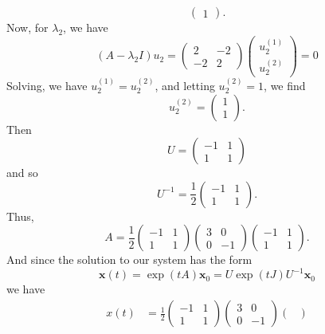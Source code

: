 \documentclass{article}
\begin{document}
\begin{itemize}
\begin{itemize}
\[\begin{pmatrix}
            1
        \end{pmatrix}.\]
        Now, for $\lambda_2$, we have
        \[(A - \lambda_2I)u_2 = \begin{pmatrix}
            2 & -2\\
            -2 & 2
        \end{pmatrix}\begin{pmatrix}
            u_2^{(1)}\\
            u_2^{(2)}
        \end{pmatrix} = 0\]
        Solving, we have $u_2^{(1)} = u_2^{(2)}$, and letting $u_2^{(2)} = 1$, we find
        \[u_2^{(2)} = \begin{pmatrix}
            1\\
            1
        \end{pmatrix}.\]
        Then
        \[U = \begin{pmatrix}
            -1 & 1\\
            1 & 1
        \end{pmatrix}\]
        and so
        \[U^{-1} = \frac{1}{2}\begin{pmatrix}
            -1 & 1\\
            1 & 1
        \end{pmatrix}.\]
        Thus,
        \[A = \frac{1}{2}\begin{pmatrix}
            -1 & 1\\
            1 & 1
        \end{pmatrix}\begin{pmatrix}
            3 & 0\\
            0 & -1
        \end{pmatrix}\begin{pmatrix}
            -1 & 1\\
            1 & 1
        \end{pmatrix}.\]
        And since the solution to our system has the form
        \[\mathbf{x}(t) = \exp(tA)\mathbf{x}_0 = U\exp(tJ)U^{-1}\mathbf{x}_0\]
        we have
        \begin{align*}
            x(t) &= \frac{1}{2}\begin{pmatrix}
                -1 & 1\\
                1 & 1
            \end{pmatrix}\begin{pmatrix}
                3 & 0\\
                0 & -1
            \end{pmatrix}\begin{pmatrix}

\end{pmatrix}
\end{align*}
\end{itemize}
\end{itemize}
\end{document}

